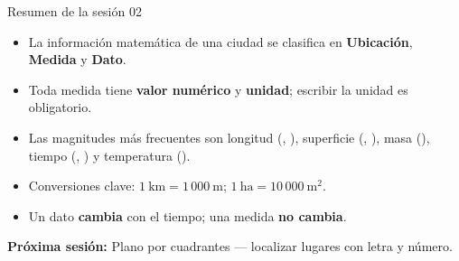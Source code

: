 \documentclass[aspectratio=169, 10pt, spanish]{beamer}
\begin{document}
\begin{frame}{Resumen de la sesión 02}
  \begin{resumenbox}
    \begin{itemize}
      \item La información matemática de una ciudad se clasifica
            en \textbf{Ubicación}, \textbf{Medida} y \textbf{Dato}.
      \item Toda medida tiene \textbf{valor numérico} y \textbf{unidad};
            escribir la unidad es obligatorio.
      \item Las magnitudes más frecuentes son longitud (, ),
            superficie (, ),
            masa (), tiempo (, ) y
            temperatura ().
      \item Conversiones clave:
            $1\ \text{km}=1\,000\ \text{m}$;
            $1\ \text{ha}=10\,000\ \text{m}^2$.
      \item Un dato \textbf{cambia} con el tiempo;
            una medida \textbf{no cambia}.
    \end{itemize}
  \end{resumenbox}
  \vspace{6pt}
  \begin{center}
    {\AlmFontSmall\color{AlmAzulM}
    \faArrowCircleRight\enskip
    \textbf{Próxima sesión:}
    Plano por cuadrantes — localizar lugares con letra y número.}
  \end{center}
\end{frame}
\end{document}

